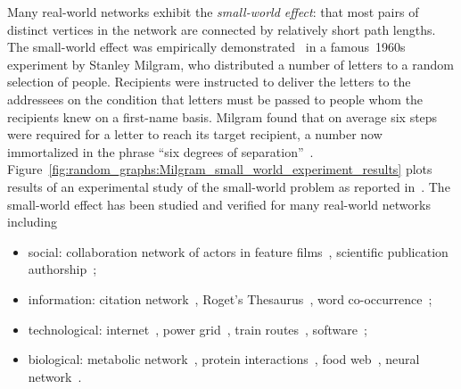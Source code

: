 Many real-world networks exhibit the
\emph{small-world effect}: that most pairs
of distinct vertices in the network are connected by relatively short
path lengths. The small-world effect was empirically
demonstrated~\cite{Milgram1967} in a famous~1960s experiment by
Stanley Milgram, who distributed a number
of letters to a random selection of people. Recipients were instructed
to deliver the letters to the addressees on the condition that letters
must be passed to people whom the recipients knew on a first-name
basis. Milgram found that on average six steps were required for a
letter to reach its target recipient, a number now immortalized in the
phrase ``six degrees of
separation''~\cite{Guare1990}.
Figure~\ref{fig:random_graphs:Milgram_small_world_experiment_results}
plots results of an experimental study of the small-world problem as
reported in~\cite{TraversMilgram1969}. The small-world effect has been
studied and verified for many real-world networks including
\begin{itemize}
\item social: collaboration network of actors in
  feature films~\cite{AmaralEtAl2000,WattsStrogatz1998}, scientific
  publication
  authorship~\cite{CastroGrossman1999,GrossmanIon1995,Newman2001a,Newman2001b};

\item information: citation
  network~\cite{Redner1998}, Roget's
  Thesaurus~\cite{Knuth1993}, word
  co-occurrence~\cite{DorogovtsevMendes2001,FerrerSole2001};

\item technological:
  internet~\cite{ChenEtAl2002,FaloutsosEtAl1999}, power
  grid~\cite{WattsStrogatz1998}, train routes~\cite{SenEtAl2003},
  software~\cite{Newman2003a,ValverdeEtAl2002};

\item biological: metabolic
  network~\cite{JeongEtAl2000}, protein
  interactions~\cite{JeongEtAl2001}, food
  web~\cite{HuxhamEtAl1996,Martinez1991}, neural
  network~\cite{WattsStrogatz1998,WhiteEtAl1986}.
\end{itemize}

